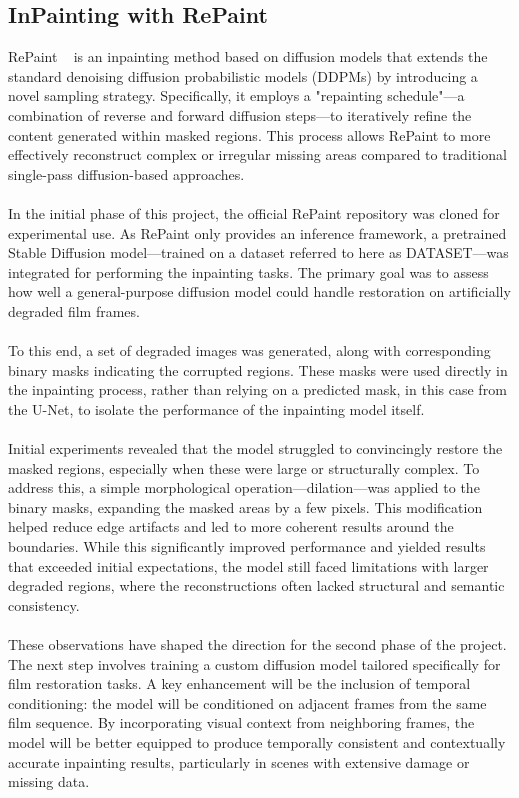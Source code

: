 \documentclass[openany, 12pt]{article}
\begin{document}
	\subsection{InPainting with RePaint}
	RePaint ~\cite{lugmayr2022repaintinpaintingusingdenoising} is an inpainting method based on diffusion models that extends the standard denoising diffusion probabilistic models (DDPMs) by introducing a novel sampling strategy. Specifically, it employs a "repainting schedule"—a combination of reverse and forward diffusion steps—to iteratively refine the content generated within masked regions. This process allows RePaint to more effectively reconstruct complex or irregular missing areas compared to traditional single-pass diffusion-based approaches.\\
	\\
	In the initial phase of this project, the official RePaint repository was cloned for experimental use. As RePaint only provides an inference framework, a pretrained Stable Diffusion model—trained on a dataset referred to here as DATASET—was integrated for performing the inpainting tasks. The primary goal was to assess how well a general-purpose diffusion model could handle restoration on artificially degraded film frames.\\
	\\
	To this end, a set of degraded images was generated, along with corresponding binary masks indicating the corrupted regions. These masks were used directly in the inpainting process, rather than relying on a predicted mask, in this case from the U-Net, to isolate the performance of the inpainting model itself.\\
	\\
	Initial experiments revealed that the model struggled to convincingly restore the masked regions, especially when these were large or structurally complex. To address this, a simple morphological operation—dilation—was applied to the binary masks, expanding the masked areas by a few pixels. This modification helped reduce edge artifacts and led to more coherent results around the boundaries. While this significantly improved performance and yielded results that exceeded initial expectations, the model still faced limitations with larger degraded regions, where the reconstructions often lacked structural and semantic consistency.\\
	\\
	These observations have shaped the direction for the second phase of the project. The next step involves training a custom diffusion model tailored specifically for film restoration tasks. A key enhancement will be the inclusion of temporal conditioning: the model will be conditioned on adjacent frames from the same film sequence. By incorporating visual context from neighboring frames, the model will be better equipped to produce temporally consistent and contextually accurate inpainting results, particularly in scenes with extensive damage or missing data.
	
\end{document}
